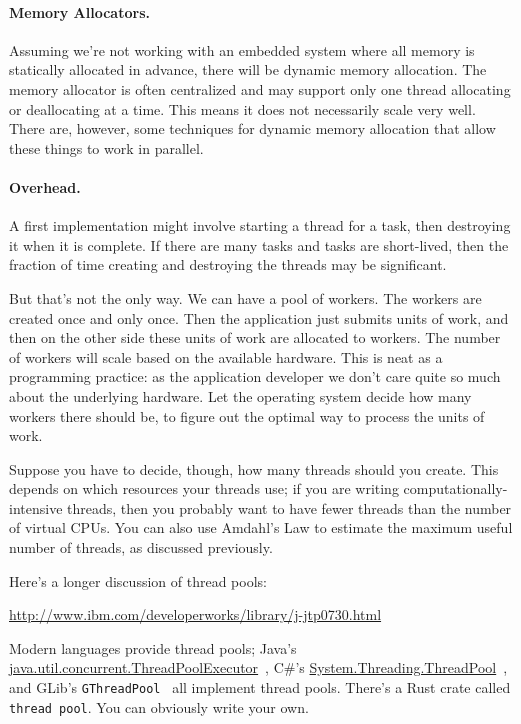 \documentclass[a4paper]{report}
\begin{document}
\paragraph{Memory Allocators.}
Assuming we're not working with an embedded system where all memory is statically allocated in advance, there will be dynamic memory allocation. The memory allocator is often centralized and may support only one thread allocating or deallocating at a time. This means it does not necessarily scale very well. There are, however, some techniques for dynamic memory allocation that allow these things to work in parallel.

\paragraph{Overhead.}
A first implementation might involve starting a thread for a task, then destroying it when it is complete. If there are many tasks and tasks are short-lived, then the fraction of time creating and destroying the threads may be significant.

 But that's not the only way. We can have a pool of workers. The workers are created once and only once. Then the application just submits units of work, and then on the other side these units of work are allocated to workers. The number of workers will scale based on the available hardware. This is neat as a programming practice: as the application developer we don't care quite so much about the underlying hardware. Let the operating system decide how many workers there should be, to figure out the optimal way to process the units of work.
 
Suppose you have to decide, though, how many threads should you create.
This depends
on which resources your threads use; if you are writing
computationally-intensive threads, then you probably want to have
fewer threads than the number of virtual CPUs. You can also use
Amdahl's Law to estimate the maximum useful number of threads, as
discussed previously.

Here's a longer discussion of thread pools:

\begin{center}
\url{http://www.ibm.com/developerworks/library/j-jtp0730.html}
\end{center}

Modern languages provide thread pools; Java's
\url{java.util.concurrent.ThreadPoolExecutor}~\cite{java:threadpoolexecutor}, C\#'s
\url{System.Threading.ThreadPool}~\cite{csharp:threadpool}, and GLib's {\tt GThreadPool}~\cite{gnome:threadpool} all implement thread pools. There's a Rust crate called \texttt{thread pool}. You can obviously write your own.
\end{document}
